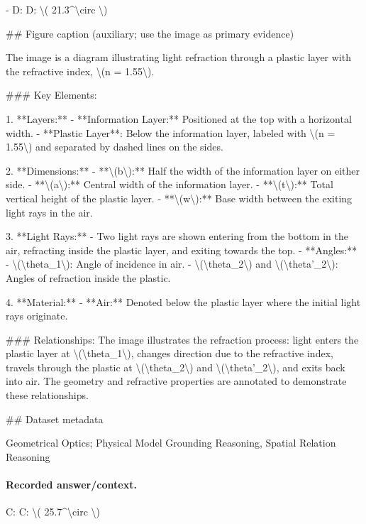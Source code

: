 - D: D: \textbackslash{}( 21.3\textasciicircum{}\textbackslash{}circ \textbackslash{})

\#\# Figure caption (auxiliary; use the image as primary evidence)

The image is a diagram illustrating light refraction through a plastic layer with the refractive index, \textbackslash{}(n = 1.55\textbackslash{}).

\#\#\# Key Elements:

1. **Layers:**
   - **Information Layer:** Positioned at the top with a horizontal width.
   - **Plastic Layer**: Below the information layer, labeled with \textbackslash{}(n = 1.55\textbackslash{}) and separated by dashed lines on the sides.

2. **Dimensions:**
   - **\textbackslash{}(b\textbackslash{}):** Half the width of the information layer on either side.
   - **\textbackslash{}(a\textbackslash{}):** Central width of the information layer.
   - **\textbackslash{}(t\textbackslash{}):** Total vertical height of the plastic layer.
   - **\textbackslash{}(w\textbackslash{}):** Base width between the exiting light rays in the air.

3. **Light Rays:**
   - Two light rays are shown entering from the bottom in the air, refracting inside the plastic layer, and exiting towards the top.
   - **Angles:** 
     - \textbackslash{}(\textbackslash{}theta\_1\textbackslash{}): Angle of incidence in air.
     - \textbackslash{}(\textbackslash{}theta\_2\textbackslash{}) and \textbackslash{}(\textbackslash{}theta'\_2\textbackslash{}): Angles of refraction inside the plastic.

4. **Material:**
   - **Air:** Denoted below the plastic layer where the initial light rays originate.

\#\#\# Relationships:
The image illustrates the refraction process: light enters the plastic layer at \textbackslash{}(\textbackslash{}theta\_1\textbackslash{}), changes direction due to the refractive index, travels through the plastic at \textbackslash{}(\textbackslash{}theta\_2\textbackslash{}) and \textbackslash{}(\textbackslash{}theta'\_2\textbackslash{}), and exits back into air. The geometry and refractive properties are annotated to demonstrate these relationships.

\#\# Dataset metadata

Geometrical Optics; Physical Model Grounding Reasoning, Spatial Relation Reasoning

\paragraph{Recorded answer/context.}
C: C: \textbackslash{}( 25.7\textasciicircum{}\textbackslash{}circ \textbackslash{})

